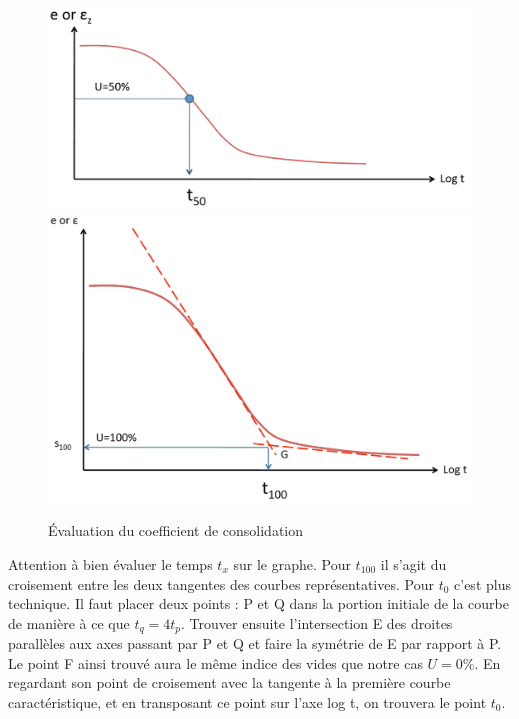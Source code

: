     \begin{figure}[ht]
        \begin{multicols}{2}
            \includegraphics[width=\linewidth]{Verastegui/images/V4.PNG}
            \vfill\null\columnbreak
            \includegraphics[width=\linewidth]{Verastegui/images/V5.PNG}
        \end{multicols}
        \caption{\'Evaluation du coefficient de consolidation}
        \label{fig:coefficient_consolidation}
    \end{figure}

    Attention à bien évaluer le temps $t_x$ sur le graphe. Pour $t_{100}$ il s'agit du croisement entre les deux tangentes des courbes représentatives. Pour $t_0$ c'est plus technique. Il faut placer deux points : P et Q dans la portion initiale de la courbe de manière à ce que $t_q = 4 t_p$. Trouver ensuite l'intersection E des droites parallèles aux axes passant par P et Q et faire la symétrie de E par rapport à P. Le point F ainsi trouvé aura le même indice des vides que notre cas $U = 0\%$. En regardant son point de croisement avec la tangente à la première courbe caractéristique, et en transposant ce point sur l'axe log t, on trouvera le point $t_0$. \\
    

